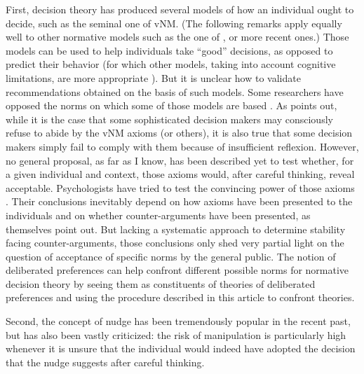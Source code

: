 \documentclass[version=last, pagesize, twoside=off, bibliography=totoc, DIV=calc, fontsize=12pt, a4paper, french, english]{scrartcl}
\begin{document}
First, decision theory has produced several models of how an individual ought to decide, such as the seminal one of vNM. (The following remarks apply equally well to other normative models such as the one of \citet{savage_foundations_1972}, \citet{keeney_decisions_1993} or more recent ones.) Those models can be used to help individuals take “good” decisions, as opposed to predict their behavior (for which other models, taking into account cognitive limitations, are more appropriate \citep{wakker_prospect_2010}). But it is unclear how to validate recommendations obtained on the basis of such models. Some researchers have opposed the norms on which some of those models are based \citep{ellsberg_risk_1961, allais_so-called_1979}. As \citet{raiffa_back_1985} points out, while it is the case that some sophisticated decision makers may consciously refuse to abide by the vNM axioms (or others), it is also true that some decision makers simply fail to comply with them because of insufficient reflexion. However, no general proposal, as far as I know, has been described yet to test whether, for a given individual and context, those axioms would, after careful thinking, reveal acceptable. Psychologists have tried to test the convincing power of those axioms \citep{slovic_who_1974, maccrimmon_utility_1979}. Their conclusions inevitably depend on how axioms have been presented to the individuals and on whether counter-arguments have been presented, as \citet{slovic_who_1974} themselves point out. But lacking a systematic approach to determine stability facing counter-arguments, those conclusions only shed very partial light on the question of acceptance of specific norms by the general public. The notion of deliberated preferences can help confront different possible norms for normative decision theory by seeing them as constituents of theories of deliberated preferences and using the procedure described in this article to confront theories.

Second, the concept of nudge \citep{thaler_nudge:_2009} has been tremendously popular in the recent past, but has also been vastly criticized: the risk of manipulation is particularly high whenever it is unsure that the individual would indeed have adopted the decision that the nudge suggests after careful thinking.
\end{document}
